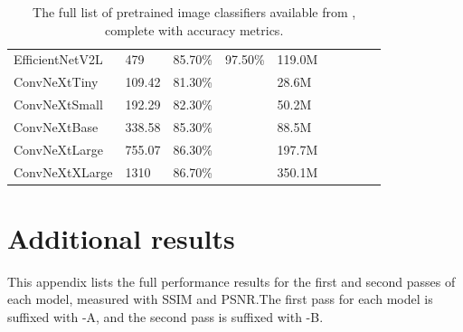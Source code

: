 \begin{appendices}
\begin{table}[ht]
{\begin{tabular}{llllllll}
            EfficientNetV2L & 479 & 85.70\% & 97.50\% & 119.0M & ~ & ~ & ~ \\ 
            ConvNeXtTiny & 109.42 & 81.30\% & ~ & 28.6M & ~ & ~ & ~ \\ 
            ConvNeXtSmall & 192.29 & 82.30\% & ~ & 50.2M & ~ & ~ & ~ \\ 
            ConvNeXtBase & 338.58 & 85.30\% & ~ & 88.5M & ~ & ~ & ~ \\ 
            ConvNeXtLarge & 755.07 & 86.30\% & ~ & 197.7M & ~ & ~ & ~ \\ 
            ConvNeXtXLarge & 1310 & 86.70\% & ~ & 350.1M & ~ & ~ & ~ \\
            \bottomrule
        \end{tabular}
    }
    \caption{The full list of pretrained image classifiers available from , complete with accuracy metrics.}
\end{table}

\chapter{Additional results}
This appendix lists the full performance results for the first and second passes of each model, measured with SSIM and PSNR.\@ The first pass for each model is suffixed with -A, and the second pass is suffixed with -B.

\end{appendices}

